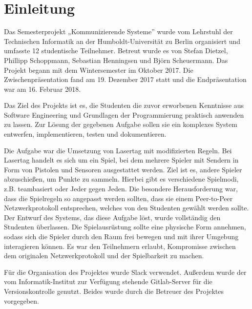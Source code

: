 \section{Einleitung}
\label{sec:einleitung}

Das Semesterprojekt „Kommunizierende Systeme” wurde vom Lehrstuhl der Technischen Informatik an der
Humboldt-Universität zu Berlin organisiert und umfasste 12 studentische Teilnehmer.
Betreut wurde es von Stefan Dietzel, Phillipp Schoppmann, Sebastian Henningsen und Björn
Scheuermann.
Das Projekt begann mit dem Wintersemester im Oktober 2017.
Die Zwischenpräsentation fand am 19. Dezember 2017 statt und die Endpräsentation war am
16. Februar 2018.

Das Ziel des Projekts ist es, die Studenten die zuvor erworbenen Kenntnisse aus
Software Engineering und Grundlagen der Programmierung praktisch anwenden zu
lassen. Zur Lösung der gegebenen Aufgabe sollen sie ein komplexes System
entwerfen, implementieren, testen und dokumentieren.

Die Aufgabe war die Umsetzung von Lasertag mit modifizierten Regeln.
Bei Lasertag handelt es sich um ein Spiel, bei dem mehrere Spieler mit Sendern
in Form von Pistolen und Sensoren ausgestattet werden. Ziel ist es, andere
Spieler abzuschießen, um Punkte zu sammeln. Hierbei gibt es verschiedene
Spielmodi, z.B. teambasiert oder Jeder gegen Jeden. Die besondere Herausforderung
war, dass die Spielregeln so angepasst werden sollten, dass sie einem Peer-to-Peer
Netzwerkprotokoll entsprechen, welches von den Studenten gewählt werden sollte.
Der Entwurf des Systems, das diese Aufgabe löst, wurde vollständig den Studenten
überlassen. Die Spielausrüstung sollte eine physische Form annehmen, sodass
sich die Spieler durch den Raum frei bewegen und mit ihrer Umgebung
interagieren können. Es war den Teilnehmern erlaubt, Kompromisse zwischen dem
originalen Netzwerkprotokoll und der Spielbarkeit zu machen.

Für die Organisation des Projektes wurde Slack verwendet.
Außerdem wurde der vom Informatik-Institut zur Verfügung stehende Gitlab-Server für die
Versionskontrolle genutzt.
Beides wurde durch die Betreuer des Projektes vorgegeben.
